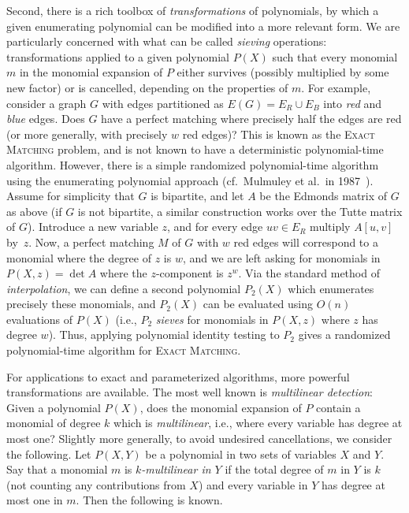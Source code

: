 \documentclass{theoretics}
\begin{document}
Second, there is a rich toolbox of \emph{transformations} of polynomials,
by which a given enumerating polynomial can be modified into a more
relevant form. We are particularly concerned with what can be called
\emph{sieving} operations: transformations applied to a given
polynomial $P(X)$ such that every monomial $m$ in the monomial expansion
of $P$ either survives (possibly multiplied by some new factor)
or is cancelled, depending on the properties of $m$. 
For example, consider a graph $G$ with edges partitioned as $E(G)=E_R \cup E_B$ 
into \emph{red} and \emph{blue} edges. Does $G$ have a perfect
matching where precisely half the edges are red (or more generally,
with precisely $w$ red edges)? 
This is known as the \textsc{Exact Matching} problem, and is
not known to have a deterministic polynomial-time algorithm. However,
there is a simple randomized polynomial-time algorithm using the
enumerating polynomial approach (cf.~Mulmuley et al.\ in 1987~\cite{MulmuleyVV87matching}).
Assume for simplicity that $G$ is
bipartite, and let $A$ be the Edmonds matrix of $G$ as above (if $G$
is not bipartite, a similar construction works over the Tutte matrix of $G$).
Introduce a new variable $z$, and for every edge $uv \in E_R$ multiply
$A[u,v]$ by~$z$. Now, a perfect matching $M$ of $G$ with $w$ red edges
will correspond to a monomial where the degree of $z$ is $w$, and we
are left asking for monomials in $P(X,z)=\det A$ where the $z$-component
is $z^w$. Via the standard method of \emph{interpolation}, we can define
a second polynomial $P_2(X)$ which enumerates precisely these monomials,
and $P_2(X)$ can be evaluated using $O(n)$ evaluations of $P(X)$ (i.e.,
$P_2$ \emph{sieves} for monomials in $P(X,z)$ where $z$ has degree $w$).
Thus, applying polynomial identity testing to $P_2$ gives a randomized
polynomial-time algorithm for \textsc{Exact Matching}. 

For applications to exact and parameterized algorithms, more powerful
transformations are available. The most well known is
\emph{multilinear detection}: Given a polynomial $P(X)$, does the
monomial expansion of $P$ contain a monomial of degree $k$ which is
\emph{multilinear}, i.e., where every variable has degree at most one?
Slightly more generally, to avoid undesired cancellations, we consider
the following. Let $P(X,Y)$ be a polynomial in two sets of variables
$X$ and $Y$. Say that a monomial $m$ is \emph{$k$-multilinear in $Y$}
if the total degree of $m$ in $Y$ is $k$ (not counting any
contributions from $X$) and every variable in $Y$ has degree at most
one in $m$. Then the following is known. 
\end{document}
